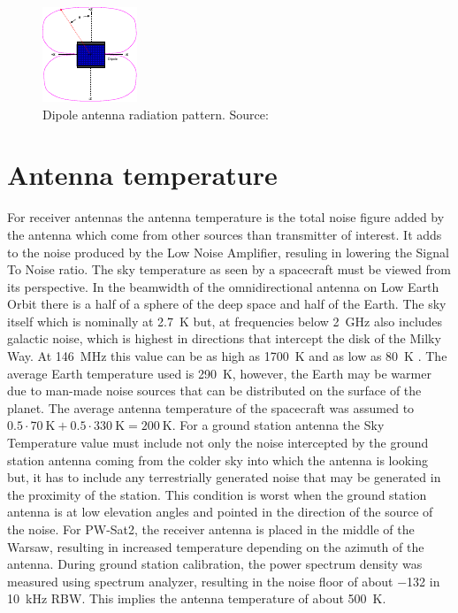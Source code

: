 \begin{figure}
    \centering
    \includegraphics[width=0.4\paperwidth]{img/8/dipole_pattern.pdf}
    \caption{Dipole antenna radiation pattern. Source: \cite{amsat_link_budget}}
    \label{link:dipole_pattern}
\end{figure}


\section{Antenna temperature}
For receiver antennas the antenna temperature is the total noise figure added by the antenna which come from other sources than transmitter of interest. It adds to the noise produced by the Low Noise Amplifier, resuling in lowering the Signal To Noise ratio.
The sky temperature as seen by a spacecraft must be viewed from its perspective. In the beamwidth of the omnidirectional antenna on Low Earth Orbit there is a half of a sphere of the deep space and half of the Earth. The sky itself which is nominally at \SI{2.7}{\kelvin} but, at frequencies below \SI{2}{\GHz} also includes galactic noise, which is highest in directions that intercept the disk of the Milky Way.  At \SI{146}{\MHz} this value can be as high as \SI{1700}{\kelvin} and as low as \SI{80}{\kelvin} \cite{amsat_link_budget}. The average Earth temperature used is \SI{290}{\kelvin}, however, the Earth may be warmer due to man-made noise sources that can be distributed on the surface of the planet. The average antenna temperature of the spacecraft was assumed to $0.5 \cdot \SI{70}{\kelvin} + 0.5 \cdot \SI{330}{\kelvin} = \SI{200}{\kelvin}$.
For a ground station antenna the Sky Temperature value must include not only the noise intercepted by the ground station antenna coming from the colder sky into which the antenna is looking but, it has to include any terrestrially generated noise that may be generated in the proximity of the station. This condition is worst when the ground station antenna is at low elevation angles and pointed in the direction of the source of the noise. For PW-Sat2, the receiver antenna is placed in the middle of the Warsaw, resulting in increased temperature depending on the azimuth of the antenna. During ground station calibration, the power spectrum density was measured using spectrum analyzer, resulting in the noise floor of about \SI{-132}{\dBm} in \SI{10}{\kHz} RBW. This implies the antenna temperature of about \SI{500}{\kelvin}.


